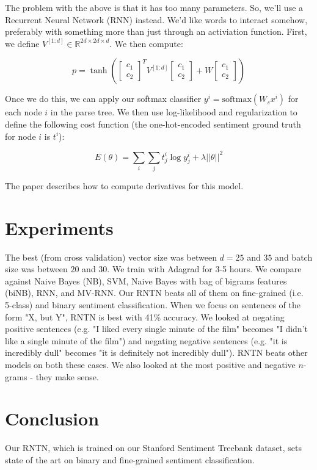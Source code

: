 \documentclass[a4paper]{article}
\begin{document}
The problem with the above is that it has too many parameters. So, we'll
use a Recurrent Neural Network (RNN) instead. We'd like words to interact
somehow, preferably with something more than just through an activiation
function. First, we define $V^{[1:d]} \in \mathbb{R}^{2d \times 2d \times d}$.
We then compute:

$$
p = \tanh(
\begin{bmatrix}
    c_1 \\
    c_2
\end{bmatrix}^T
V^{[1:d]}
\begin{bmatrix}
    c_1 \\
    c_2
\end{bmatrix}
+ W
\begin{bmatrix}
    c_1 \\
    c_2
\end{bmatrix}
)
$$

Once we do this, we can apply our softmax classifier
$y^i = \textrm{softmax}(W_s x^i)$ for each node $i$ in the parse tree. We
then use log-likelihood and regularization to define the following cost
function (the one-hot-encoded sentiment ground truth for node $i$ is $t^i$):

$$
E(\theta) = \sum_{i}{\sum_{j}{t_j^i \log{y_j^i} + \lambda || \theta ||^2}}
$$

The paper describes how to compute derivatives for this model.

\section{Experiments}
The best (from cross validation) vector size was between $d = 25$ and $35$ and
batch size was between $20$ and $30$. We train with Adagrad for 3-5 hours.
We compare against Naive Bayes (NB), SVM, Naive Bayes with bag of bigrams
features (biNB), RNN, and MV-RNN. Our RNTN beats all of them on fine-grained
(i.e. 5-class) and binary sentiment classification. When we focus on sentences
of the form "X, but Y", RNTN is best with 41\% accuracy. We looked
at negating positive sentences (e.g. "I liked every single minute of the film"
becomes "I didn't like a single minute of the film") and negating negative
sentences (e.g. "it is incredibly dull" becomes "it is definitely not incredibly
dull"). RNTN beats other models on both these cases. We also looked at the most
positive and negative $n$-grams - they make sense.

\section{Conclusion}
Our RNTN, which is trained on our Stanford Sentiment Treebank dataset, sets
state of the art on binary and fine-grained sentiment classification.
\end{document}
